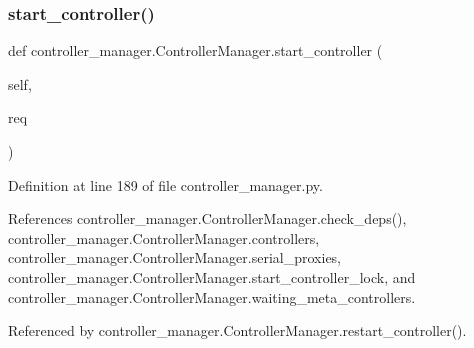 \subsubsection{\texorpdfstring{start\+\_\+controller()}{start\_controller()}}
{\footnotesize\ttfamily def controller\+\_\+manager.\+Controller\+Manager.\+start\+\_\+controller (\begin{DoxyParamCaption}\item[{}]{self,  }\item[{}]{req }\end{DoxyParamCaption})}



Definition at line 189 of file controller\+\_\+manager.\+py.



References controller\+\_\+manager.\+Controller\+Manager.\+check\+\_\+deps(), controller\+\_\+manager.\+Controller\+Manager.\+controllers, controller\+\_\+manager.\+Controller\+Manager.\+serial\+\_\+proxies, controller\+\_\+manager.\+Controller\+Manager.\+start\+\_\+controller\+\_\+lock, and controller\+\_\+manager.\+Controller\+Manager.\+waiting\+\_\+meta\+\_\+controllers.



Referenced by controller\+\_\+manager.\+Controller\+Manager.\+restart\+\_\+controller().



